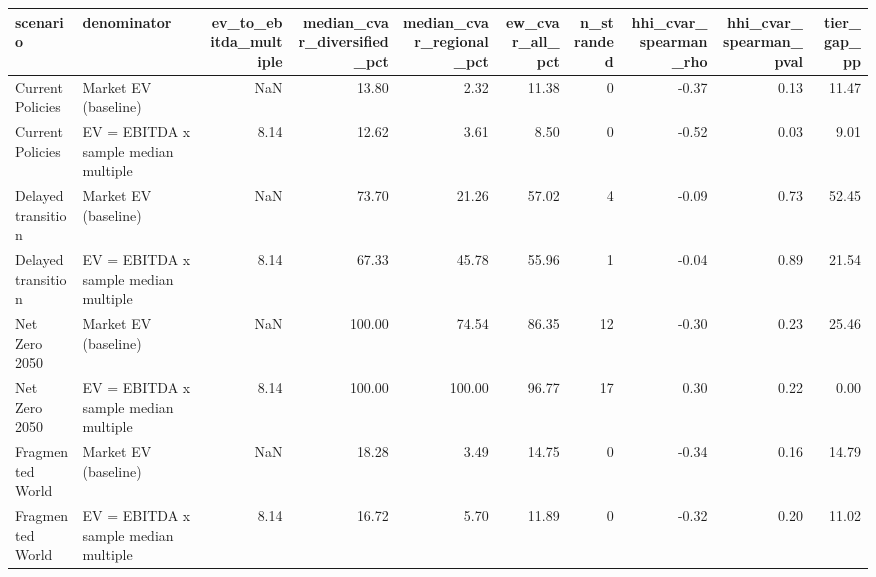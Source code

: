 \begin{tabular}{llrrrrrrrr}
\toprule
scenario & denominator & ev_to_ebitda_multiple & median_cvar_diversified_pct & median_cvar_regional_pct & ew_cvar_all_pct & n_stranded & hhi_cvar_spearman_rho & hhi_cvar_spearman_pval & tier_gap_pp \\
\midrule
Current Policies & Market EV (baseline) & NaN & 13.80 & 2.32 & 11.38 & 0 & -0.37 & 0.13 & 11.47 \\
Current Policies & EV = EBITDA x sample median multiple & 8.14 & 12.62 & 3.61 & 8.50 & 0 & -0.52 & 0.03 & 9.01 \\
Delayed transition & Market EV (baseline) & NaN & 73.70 & 21.26 & 57.02 & 4 & -0.09 & 0.73 & 52.45 \\
Delayed transition & EV = EBITDA x sample median multiple & 8.14 & 67.33 & 45.78 & 55.96 & 1 & -0.04 & 0.89 & 21.54 \\
Net Zero 2050 & Market EV (baseline) & NaN & 100.00 & 74.54 & 86.35 & 12 & -0.30 & 0.23 & 25.46 \\
Net Zero 2050 & EV = EBITDA x sample median multiple & 8.14 & 100.00 & 100.00 & 96.77 & 17 & 0.30 & 0.22 & 0.00 \\
Fragmented World & Market EV (baseline) & NaN & 18.28 & 3.49 & 14.75 & 0 & -0.34 & 0.16 & 14.79 \\
Fragmented World & EV = EBITDA x sample median multiple & 8.14 & 16.72 & 5.70 & 11.89 & 0 & -0.32 & 0.20 & 11.02 \\
\bottomrule
\end{tabular}
